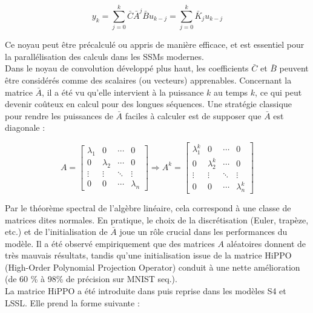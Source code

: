 \begin{equation}
    y_k = \sum_{j=0}^k \bar{C} \bar{A}^j \bar{B} u_{k-j} = \sum_{j=0}^k \bar{K}_j u_{k-j}
\end{equation}

Ce noyau peut \^etre précalculé ou appris de manière efficace, et est essentiel pour la parallélisation des calculs dans les SSMs modernes.\\

Dans le noyau de convolution développé plus haut, les coefficients $\bar{C}$ et $\bar{B}$ peuvent \^etre considérés comme des scalaires (ou vecteurs) apprenables. Concernant la matrice $\bar{A}$, il a été vu qu'elle intervient à la puissance $k$ au temps $k$, ce qui peut devenir co\^uteux en calcul pour des longues séquences. Une stratégie classique pour rendre les puissances de $\bar{A}$ faciles à calculer est de supposer que $\bar{A}$ est diagonale :

\begin{equation}
A = \begin{bmatrix}
\lambda_1 & 0 & \cdots & 0 \\
0 & \lambda_2 & \cdots & 0 \\
\vdots & \vdots & \ddots & \vdots \\
0 & 0 & \cdots & \lambda_n
\end{bmatrix} \Rightarrow A^k = \begin{bmatrix}
\lambda_1^k & 0 & \cdots & 0 \\
0 & \lambda_2^k & \cdots & 0 \\
\vdots & \vdots & \ddots & \vdots \\
0 & 0 & \cdots & \lambda_n^k
\end{bmatrix}
\end{equation}

Par le théorème spectral de l’algèbre linéaire, cela correspond à une classe de matrices dites normales. En pratique, le choix de la discrétisation (Euler, trapèze, etc.) et de l’initialisation de $\bar{A}$ joue un rôle crucial dans les performances du modèle. Il a été observé empiriquement que des matrices $A$ aléatoires donnent de très mauvais résultats, tandis qu’une initialisation issue de la matrice HiPPO (High-Order Polynomial Projection Operator) conduit à une nette amélioration (de 60 \% à 98\% de précision sur MNIST seq.).\\

La matrice HiPPO a été introduite dans \citep{gu2020hippo} puis reprise dans les modèles S4 \citep{sun2023retnet} et LSSL. Elle prend la forme suivante :

